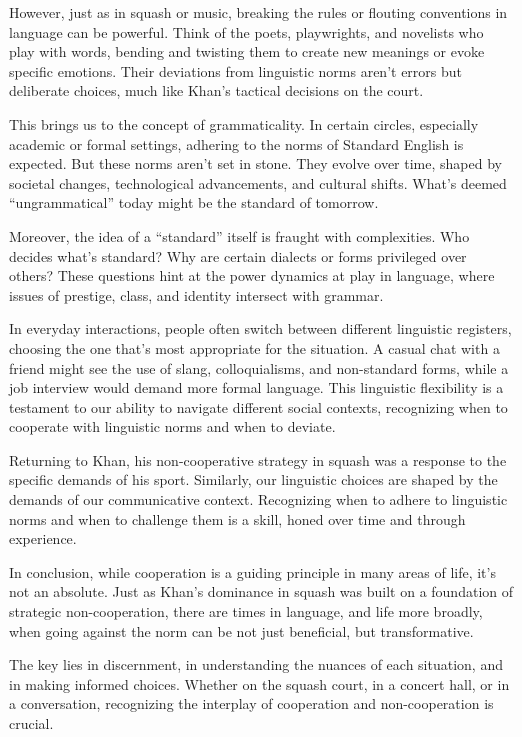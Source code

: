 However, just as in squash or music, breaking the rules or flouting conventions in language can be powerful. Think of the poets, playwrights, and novelists who play with words, bending and twisting them to create new meanings or evoke specific emotions. Their deviations from linguistic norms aren't errors but deliberate choices, much like Khan's tactical decisions on the court.

This brings us to the concept of grammaticality. In certain circles, especially academic or formal settings, adhering to the norms of Standard English is expected. But these norms aren't set in stone. They evolve over time, shaped by societal changes, technological advancements, and cultural shifts. What's deemed ``ungrammatical'' today might be the standard of tomorrow.

Moreover, the idea of a ``standard'' itself is fraught with complexities. Who decides what's standard? Why are certain dialects or forms privileged over others? These questions hint at the power dynamics at play in language, where issues of prestige, class, and identity intersect with grammar.

In everyday interactions, people often switch between different linguistic registers, choosing the one that's most appropriate for the situation. A casual chat with a friend might see the use of slang, colloquialisms, and non-standard forms, while a job interview would demand more formal language. This linguistic flexibility is a testament to our ability to navigate different social contexts, recognizing when to cooperate with linguistic norms and when to deviate.

Returning to Khan, his non-cooperative strategy in squash was a response to the specific demands of his sport. Similarly, our linguistic choices are shaped by the demands of our communicative context. Recognizing when to adhere to linguistic norms and when to challenge them is a skill, honed over time and through experience.

In conclusion, while cooperation is a guiding principle in many areas of life, it's not an absolute. Just as Khan's dominance in squash was built on a foundation of strategic non-cooperation, there are times in language, and life more broadly, when going against the norm can be not just beneficial, but transformative.

The key lies in discernment, in understanding the nuances of each situation, and in making informed choices. Whether on the squash court, in a concert hall, or in a conversation, recognizing the interplay of cooperation and non-cooperation is crucial.

